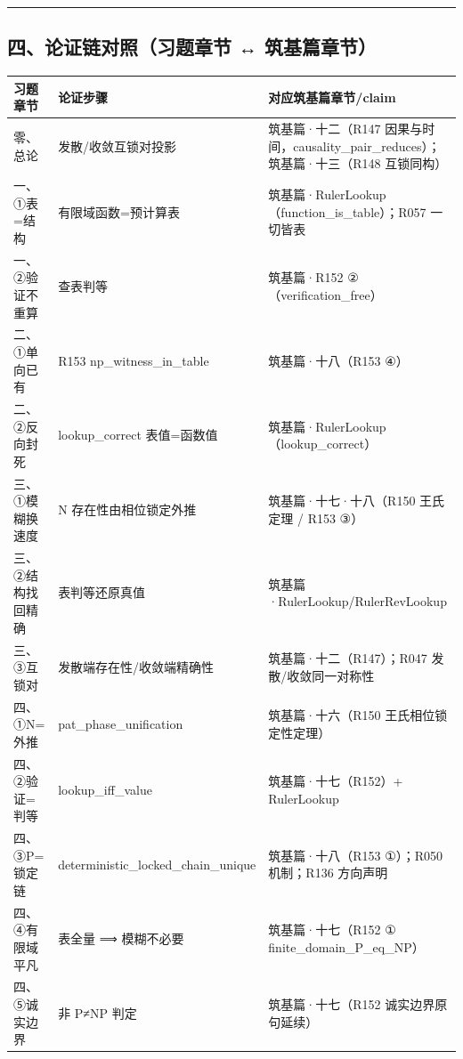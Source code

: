 \documentclass[
]{article}
\newcounter{none} %
\begin{document}
\begin{center}\rule{0.5\linewidth}{0.5pt}\end{center}

\subsection{四、论证链对照（习题章节 ↔
筑基篇章节）}\label{ux56dbux8bbaux8bc1ux94feux5bf9ux7167ux4e60ux9898ux7ae0ux8282-ux7b51ux57faux7bc7ux7ae0ux8282}

{\def\LTcaptype{none} %
\begin{longtable}[]{@{}
  >{\raggedright\arraybackslash}p{}
  >{\raggedright\arraybackslash}p{}
  >{\raggedright\arraybackslash}p{}@{}}
\toprule\noalign{}
\begin{minipage}[b]{\linewidth}\raggedright
习题章节
\end{minipage} & \begin{minipage}[b]{\linewidth}\raggedright
论证步骤
\end{minipage} & \begin{minipage}[b]{\linewidth}\raggedright
对应筑基篇章节/claim
\end{minipage} \\
\midrule\noalign{}
\endhead
\bottomrule\noalign{}
\endlastfoot
零、总论 & 发散/收敛互锁对投影 & 筑基篇·十二（R147
因果与时间，causality\_pair\_reduces）；筑基篇·十三（R148 互锁同构） \\
一、①表=结构 & 有限域函数=预计算表 &
筑基篇·RulerLookup（function\_is\_table）；R057 一切皆表 \\
一、②验证不重算 & 查表判等 & 筑基篇·R152 ②（verification\_free） \\
二、①单向已有 & R153 np\_witness\_in\_table & 筑基篇·十八（R153 ④） \\
二、②反向封死 & lookup\_correct 表值=函数值 &
筑基篇·RulerLookup（lookup\_correct） \\
三、①模糊换速度 & N 存在性由相位锁定外推 & 筑基篇·十七·十八（R150
王氏定理 / R153 ③） \\
三、②结构找回精确 & 表判等还原真值 &
筑基篇·RulerLookup/RulerRevLookup \\
三、③互锁对 & 发散端存在性/收敛端精确性 & 筑基篇·十二（R147）；R047
发散/收敛同一对称性 \\
四、①N=外推 & pat\_phase\_unification & 筑基篇·十六（R150
王氏相位锁定性定理） \\
四、②验证=判等 & lookup\_iff\_value & 筑基篇·十七（R152）+
RulerLookup \\
四、③P=锁定链 & deterministic\_locked\_chain\_unique & 筑基篇·十八（R153
①）；R050 机制；R136 方向声明 \\
四、④有限域平凡 & 表全量 ⟹ 模糊不必要 & 筑基篇·十七（R152 ①
finite\_domain\_P\_eq\_NP） \\
四、⑤诚实边界 & 非 P≠NP 判定 & 筑基篇·十七（R152 诚实边界原句延续） \\
\end{longtable}
}
\end{document}
